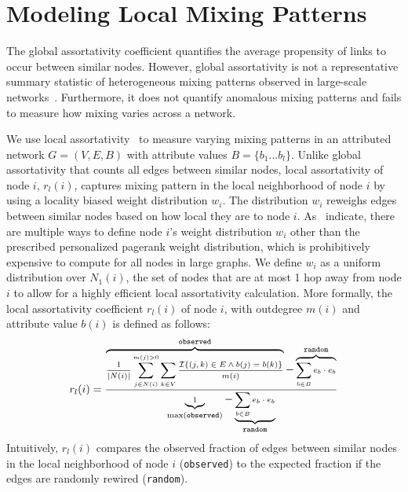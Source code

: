 \section{Modeling Local Mixing Patterns}
\label{subsec:LocalMixing}

The global assortativity coefficient quantifies
the average propensity of links to occur between similar nodes.
However, global assortativity is not a representative summary statistic of
heterogeneous mixing patterns observed in large-scale networks~\cite{peel2018multiscale}.
Furthermore, it does not quantify anomalous mixing patterns and fails to measure how mixing varies across a network.

We use local assortativity~\cite{peel2018multiscale} to measure varying
mixing patterns in an attributed network $G=(V,E,B)$ with attribute values $B=\{b_1...b_l\}$.
Unlike global assortativity that counts all edges between similar nodes, local assortativity
of node $i$, $r_l(i)$, captures mixing pattern in the local neighborhood of node
$i$ by using a locality biased weight distribution $w_i$. The distribution
$w_i$ reweighs edges between similar nodes based on how local they are to
node $i$.
As~\citet{peel2018multiscale} indicate, there are multiple ways
to define node $i$'s weight distribution $w_i$ other than the prescribed
personalized pagerank weight distribution, which is prohibitively expensive to compute
for all nodes in large graphs.
We define $w_i$ as a uniform distribution over $N_1(i)$, the set of nodes that
are at most 1 hop away from node $i$ to allow for a highly efficient
local assortativity calculation.
More formally, the local assortativity coefficient $r_l(i)$ of node $i$, with outdegree $m(i)$ and
attribute value $b(i)$ is defined as follows:
\vspace{-1mm}
\begin{align*}
	\scriptsize r_l(i) = \frac{\overbrace{\frac{1}{|N(i)|}\sum\limits_{j \in N(i)}^{m(j) > 0} \sum_{k \in V} \frac{\mathcal{I}\{(j,k) \in E \wedge b(j)=b(k)\}}{m(i)} }^{\texttt{observed}}-\overbrace{\sum_{b \in B} e_{b}\cdot e_{b}}^{\texttt{random}}}{\underbrace{1}_{\max(\texttt{observed})}-\underbrace{\sum_{b \in B} e_{b} \cdot e_{b}}_\texttt{random}}
\end{align*}
Intuitively, $r_l(i)$ compares the observed fraction of edges between similar nodes
in the local neighborhood of node $i$ (\texttt{observed}) to the expected fraction
if the edges are randomly rewired (\texttt{random}).

